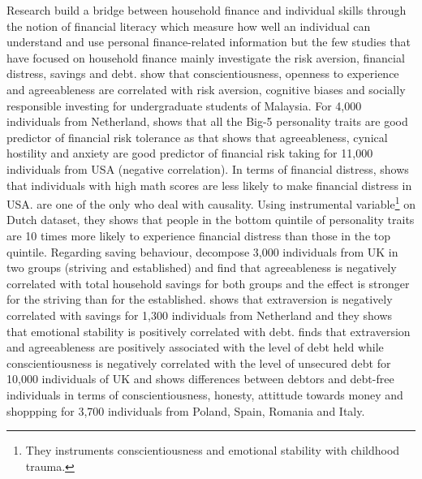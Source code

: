 \documentclass[a4paper, 11pt, onecolumn]{article}
\begin{document}
Research build a bridge between household finance and individual skills through the notion of financial literacy which measure how well an individual can understand and use personal finance-related information \citep{Huston2010, Hastings2013, Gaurav2012, Klapper2012, Horn2021} but the few studies that have focused on household finance mainly investigate the risk aversion, financial distress, savings and debt.
\cite{Nga2013} show that conscientiousness, openness to experience and agreeableness are correlated with risk aversion, cognitive biases and socially responsible investing for undergraduate students of Malaysia.
For 4,000 individuals from Netherland, \cite{Pinjisakikool2017} shows that all the Big-5 personality traits are good predictor of financial risk tolerance as \cite{Bucciol2017} that shows that agreeableness, cynical hostility and anxiety are good predictor of financial risk taking for 11,000 individuals from USA (negative correlation).
In terms of financial distress, \cite{Agarwal2013} shows that individuals with high math scores are less likely to make financial distress in USA.
\cite{Parise2019} are one of the only who deal with causality.
Using instrumental variable\footnote{They instruments conscientiousness and emotional stability with childhood trauma.} on Dutch dataset, they shows that people in the bottom quintile of personality traits are 10 times more likely to experience financial distress than those in the top quintile.
Regarding saving behaviour, \cite{Gerhard2018} decompose 3,000 individuals from UK in two groups (striving and established) and find that agreeableness is negatively correlated with total household savings for both groups and the effect is stronger for the striving than for the established.
\cite{Nyhus2001} shows that extraversion is negatively correlated with savings for 1,300 individuals from Netherland and they shows that emotional stability is positively correlated with debt.
\cite{Brown2014} finds that extraversion and agreeableness are positively associated with the level of debt held while conscientiousness is negatively correlated with the level of unsecured debt for 10,000 individuals of UK and \cite{Forlicz2019} shows differences between debtors and debt-free individuals in terms of conscientiousness, honesty, attittude towards money and shoppping for 3,700 individuals from Poland, Spain, Romania and Italy.
\end{document}
